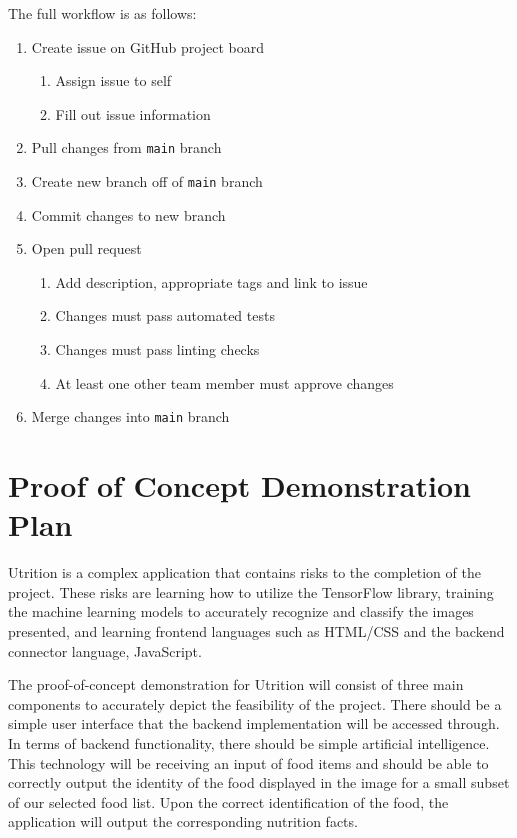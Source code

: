 \documentclass{article}
\begin{document}
The full workflow is as follows:

\begin{enumerate}
	\item Create issue on GitHub project board
	\begin{enumerate}
		\item Assign issue to self
		\item Fill out issue information
	\end{enumerate}
	\item Pull changes from \texttt{main} branch
	\item Create new branch off of \texttt{main} branch
	\item Commit changes to new branch
	\item Open pull request
	\begin{enumerate}
		\item Add description, appropriate tags and link to issue
		\item Changes must pass automated tests
		\item Changes must pass linting checks
		\item At least one other team member must approve changes
	\end{enumerate}
	\item Merge changes into \texttt{main} branch
	
\end{enumerate}
\section{Proof of Concept Demonstration Plan}

Utrition is a complex application that contains risks to the completion of the project. These risks are learning how to utilize the TensorFlow library, training the machine learning models to accurately recognize and classify the images presented, and learning frontend languages such as HTML/CSS and the backend connector language, JavaScript.

The proof-of-concept demonstration for Utrition will consist of three main components to accurately depict the feasibility of the project. There should be a simple user interface that the backend implementation will be accessed through. In terms of backend functionality, there should be simple artificial intelligence. This technology will be receiving an input of food items and should be able to correctly output the identity of the food displayed in the image for a small subset of our selected food list. Upon the correct identification of the food, the application will output the corresponding nutrition facts.
\end{document}
